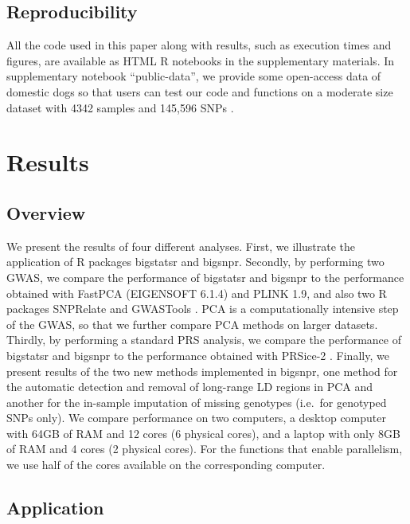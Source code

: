 \documentclass{bioinfo}
\begin{document}
\begin{methods}
\subsection{Reproducibility}

All the code used in this paper along with results, such as execution times and figures, are available as HTML R notebooks in the supplementary materials. 
{\color{red}
In supplementary notebook ``public-data'', we provide some open-access data of domestic dogs so that users can test our code and functions on a moderate size dataset with 4342 samples and 145,596 SNPs \cite[]{hayward2016complex}.
}

\end{methods}

\section{Results}

\subsection{Overview}\label{sec:overview}

We present the results of four different analyses. 
First, we illustrate the application of R packages bigstatsr and bigsnpr. 
Secondly, by performing two GWAS, we compare the performance of bigstatsr and bigsnpr to the performance obtained with FastPCA (EIGENSOFT 6.1.4) and PLINK 1.9, and also two R packages SNPRelate and GWASTools \cite[]{chang2015second,Galinsky2016,Gogarten2012,zheng2012high}. PCA is a computationally intensive step of the GWAS, so that we further compare PCA methods on larger datasets.
Thirdly, by performing a standard PRS analysis, we compare the performance of bigstatsr and bigsnpr to the performance obtained with PRSice-2 \cite[]{Euesden2015}. 
Finally, we present results of the two new methods implemented in bigsnpr, one method for the automatic detection and removal of long-range LD regions in PCA and another for the in-sample imputation of missing genotypes (i.e.\ for genotyped SNPs only). 
We compare performance on two computers, a desktop computer with 64GB of RAM and 12 cores (6 physical cores), and a laptop with only 8GB of RAM and 4 cores (2 physical cores). For the functions that enable parallelism, we use half of the cores available on the corresponding computer.

\subsection{Application}
 
\end{document}
